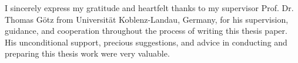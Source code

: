I sincerely express my gratitude and heartfelt thanks to my supervisor Prof. Dr. Thomas G\"otz from Universit\"at Koblenz-Landau, Germany, for his supervision, guidance, and cooperation throughout the process of writing this thesis paper. His unconditional support, precious suggestions, and advice in conducting and preparing this thesis work were very valuable.
